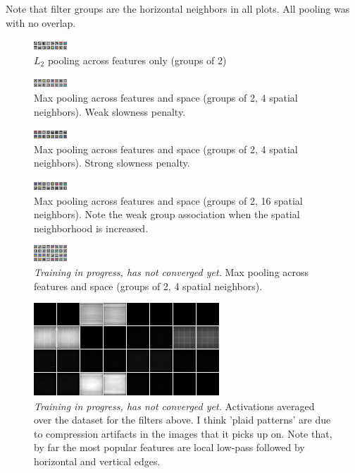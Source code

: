 \documentclass[12pt,a4paper]{report}
\begin{document}
Note that filter groups are the horizontal neighbors in all plots. All pooling was with no overlap.  

\begin{figure}[h]
\centering
\includegraphics[scale=5]{L2_f2s1.png}
\caption{$L_2$ pooling across features only (groups of 2) }
\end{figure} 

\begin{figure}[h]
\centering
\includegraphics[scale=5]{max_weak_f2s2.png}
\caption{Max pooling across features and space (groups of 2, 4 spatial neighbors). Weak slowness penalty. }
\end{figure} 

\begin{figure}[h]
\centering
\includegraphics[scale=5]{max_strong_f2s2.png}
\caption{Max pooling across features and space (groups of 2, 4 spatial neighbors). Strong slowness penalty. }
\end{figure} 

\begin{figure}[h]
\centering
\includegraphics[scale=5]{max_f2s4.png}
\caption{Max pooling across features and space (groups of 2, 16 spatial neighbors). Note the weak group association when the spatial neighborhood is increased.}
\end{figure} 

\begin{figure}[h]
\centering
\includegraphics[scale=5]{large.png}
\caption{ \emph{Training in progress, has not converged yet.} Max pooling across features and space (groups of 2, 4 spatial neighbors).}
\end{figure} 

\begin{figure}[h]
\centering
\includegraphics[scale=1]{large_act.png}
\caption{ \emph{Training in progress, has not converged yet.} Activations averaged over the dataset for the filters above. I think 'plaid patterns' are due to compression artifacts in the images that it picks up on. Note that, by far the most popular features are local low-pass followed by horizontal and vertical edges.}
\end{figure} 
\end{document}
